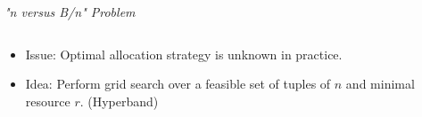 \begin{frame}{\emph{"n versus B/n" Problem}}
\begin{columns}
\begin{column}{.45\linewidth}
\begin{itemize}
    \item Issue: Optimal allocation strategy is unknown in practice.
    \item Idea: Perform grid search over a feasible set of tuples of $n$ and minimal resource $r$. (Hyperband) 
\end{itemize}
\end{column}

\begin{column}{.45\linewidth}

\end{column}
    
\end{columns}
    
\end{frame}



